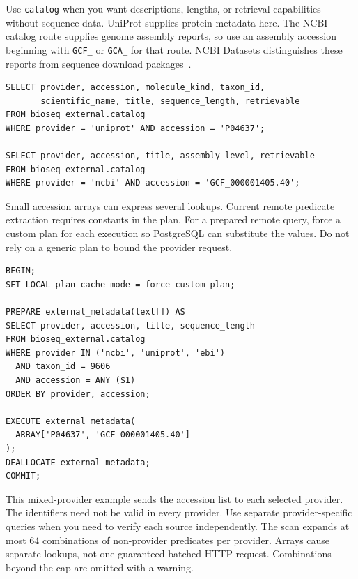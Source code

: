Use \texttt{catalog} when you want descriptions, lengths, or retrieval
capabilities without sequence data. UniProt supplies protein metadata here.
The NCBI catalog route supplies genome assembly reports, so use an assembly
accession beginning with \texttt{GCF\_} or \texttt{GCA\_} for that route.
NCBI Datasets distinguishes these reports from sequence download
packages~\autocite{ncbi_datasets_v2_api}.

\par\noindent\begin{minipage}{\linewidth}
\begin{lstlisting}[style=bioseq-appendix-sql]
SELECT provider, accession, molecule_kind, taxon_id,
       scientific_name, title, sequence_length, retrievable
FROM bioseq_external.catalog
WHERE provider = 'uniprot' AND accession = 'P04637';

SELECT provider, accession, title, assembly_level, retrievable
FROM bioseq_external.catalog
WHERE provider = 'ncbi' AND accession = 'GCF_000001405.40';
\end{lstlisting}
\end{minipage}

Small accession arrays can express several lookups. Current remote predicate
extraction requires constants in the plan. For a prepared remote query, force
a custom plan for each execution so PostgreSQL can substitute the values.
Do not rely on a generic plan to bound the provider request.

\par\noindent\begin{minipage}{\linewidth}
\begin{lstlisting}[style=bioseq-appendix-sql]
BEGIN;
SET LOCAL plan_cache_mode = force_custom_plan;

PREPARE external_metadata(text[]) AS
SELECT provider, accession, title, sequence_length
FROM bioseq_external.catalog
WHERE provider IN ('ncbi', 'uniprot', 'ebi')
  AND taxon_id = 9606
  AND accession = ANY ($1)
ORDER BY provider, accession;

EXECUTE external_metadata(
  ARRAY['P04637', 'GCF_000001405.40']
);
DEALLOCATE external_metadata;
COMMIT;
\end{lstlisting}
\end{minipage}

This mixed-provider example sends the accession list to each selected
provider. The identifiers need not be valid in every provider. Use separate
provider-specific queries when you need to verify each source independently.
The scan expands at most 64 combinations of non-provider predicates per
provider. Arrays cause separate lookups, not one guaranteed batched HTTP
request. Combinations beyond the cap are omitted with a warning.

